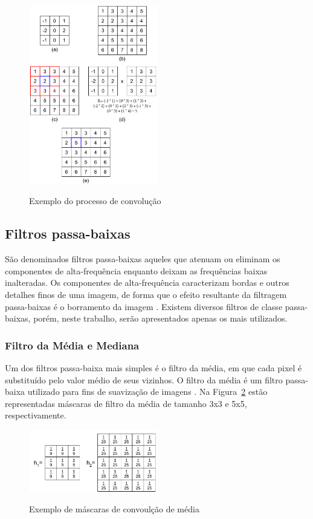 \documentclass[12pt,oneside,a4paper,english,french,spanish,brazil,]{abntex2}
\begin{document}
\begin{figure}[ht]
\centering
\caption{Exemplo do processo de convolução}
\includegraphics[width=0.5\textwidth]{imagens/PDI_Convolucao.pdf}
\sourceAuthor
\label{fig:PDI_Convolucao}
\end{figure}

\subsection{Filtros passa-baixas}

São denominados filtros passa-baixas aqueles que atenuam ou eliminam os componentes de alta-frequência enquanto deixam as frequências baixas inalteradas. Os componentes de alta-frequência caracterizam bordas e outros detalhes finos de uma imagem, de forma que o efeito resultante da filtragem passa-baixas é o borramento da imagem \cite{gonzalez:2012}. Existem diversos filtros de classe passa-baixas, porém, neste trabalho, serão apresentados apenas os mais utilizados.

\subsubsection{Filtro da Média e Mediana}

Um dos filtros passa-baixa mais simples é o filtro da média, em que cada pixel é substituído pelo valor médio de seus vizinhos. O filtro da média é um filtro passa-baixa utilizado para fins de suavização de imagens \cite{pedrini:2008}. Na Figura~\ref{fig:PDI_Mascara_Media} estão representadas máscaras de filtro da média de tamanho 3x3 e 5x5, respectivamente.

\begin{figure}[ht]
\centering
\caption{Exemplo de máscaras de convoulção de média}
\includegraphics[width=0.5\textwidth]{imagens/PDI_Mascara_Media.pdf}
\label{fig:PDI_Mascara_Media}
\end{figure}
\end{document}
